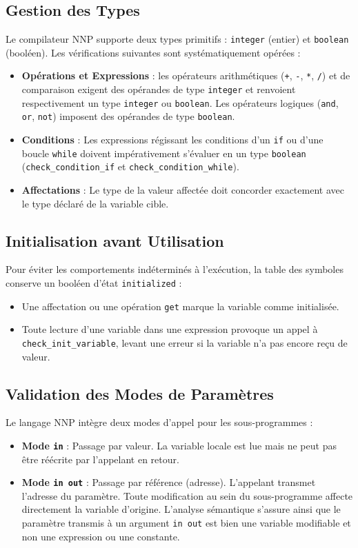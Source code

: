 \documentclass[a4paper, 12pt]{article}
\begin{document}
\subsection{Gestion des Types}
Le compilateur NNP supporte deux types primitifs : \texttt{integer} (entier) et \texttt{boolean} (booléen). Les vérifications suivantes sont systématiquement opérées :
\begin{itemize}
    \item \textbf{Opérations et Expressions} : les opérateurs arithmétiques (\texttt{+}, \texttt{-}, \texttt{*}, \texttt{/}) et de comparaison exigent des opérandes de type \texttt{integer} et renvoient respectivement un type \texttt{integer} ou \texttt{boolean}. Les opérateurs logiques (\texttt{and}, \texttt{or}, \texttt{not}) imposent des opérandes de type \texttt{boolean}.
    \item \textbf{Conditions} : Les expressions régissant les conditions d'un \texttt{if} ou d'une boucle \texttt{while} doivent impérativement s'évaluer en un type \texttt{boolean} (\texttt{check\_condition\_if} et \texttt{check\_condition\_while}).
    \item \textbf{Affectations} : Le type de la valeur affectée doit concorder exactement avec le type déclaré de la variable cible.
\end{itemize}

\subsection{Initialisation avant Utilisation}
Pour éviter les comportements indéterminés à l'exécution, la table des symboles conserve un booléen d'état \texttt{initialized} :
\begin{itemize}
    \item Une affectation ou une opération \texttt{get} marque la variable comme initialisée.
    \item Toute lecture d'une variable dans une expression provoque un appel à \texttt{check\_init\_}\allowbreak\texttt{variable}, levant une erreur si la variable n'a pas encore reçu de valeur.
\end{itemize}

\subsection{Validation des Modes de Paramètres}
Le langage NNP intègre deux modes d'appel pour les sous-programmes :
\begin{itemize}
    \item \textbf{Mode \texttt{in}} : Passage par valeur. La variable locale est lue mais ne peut pas être réécrite par l'appelant en retour.
    \item \textbf{Mode \texttt{in out}} : Passage par référence (adresse). L'appelant transmet l'adresse du paramètre. Toute modification au sein du sous-programme affecte directement la variable d'origine. L'analyse sémantique s'assure ainsi que le paramètre transmis à un argument \texttt{in out} est bien une variable modifiable et non une expression ou une constante.
\end{itemize}
\end{document}
